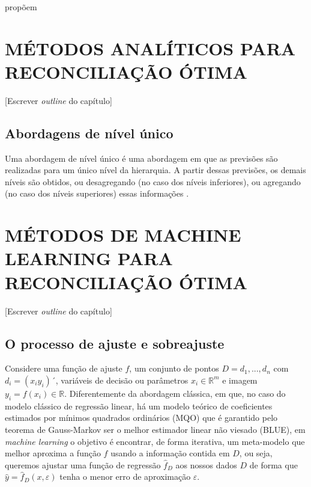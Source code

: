\documentclass[
  12pt,
  oneside,
  a4paper,
  chapter=TITLE,
  section=TITLE,
  brazil]{abntex2}
\begin{document}
\textcite{spiliotis_hierarchical_2021} propõem

\hypertarget{muxe9todos-analuxedticos-para-reconciliauxe7uxe3o-uxf3tima}{%
\section{MÉTODOS ANALÍTICOS PARA RECONCILIAÇÃO
ÓTIMA}\label{muxe9todos-analuxedticos-para-reconciliauxe7uxe3o-uxf3tima}}

{[}Escrever \emph{outline} do capítulo{]}

\hypertarget{abordagens-de-nuxedvel-uxfanico}{%
\subsection{Abordagens de nível
único}\label{abordagens-de-nuxedvel-uxfanico}}

Uma abordagem de nível único é uma abordagem em que as previsões são
realizadas para um único nível da hierarquia. A partir dessas previsões,
os demais níveis são obtidos, ou desagregando (no caso dos níveis
inferiores), ou agregando (no caso dos níveis superiores) essas
informações \autocite{hyndman_forecasting_2021}.

\hypertarget{muxe9todos-de-machine-learning-para-reconciliauxe7uxe3o-uxf3tima}{%
\section{MÉTODOS DE MACHINE LEARNING PARA RECONCILIAÇÃO
ÓTIMA}\label{muxe9todos-de-machine-learning-para-reconciliauxe7uxe3o-uxf3tima}}

{[}Escrever \emph{outline} do capítulo{]}

\hypertarget{o-processo-de-ajuste-e-sobreajuste}{%
\subsection{O processo de ajuste e
sobreajuste}\label{o-processo-de-ajuste-e-sobreajuste}}

Considere uma função de ajuste \(f\), um conjunto de pontos
\(D = {d_1, ..., d_n}\) com \(d_i = (x_i y_i)´\), variáveis de decisão
ou parâmetros \(x_i \in \mathbb{R}^m\) e imagem
\(y_i = f(x_i) \in \mathbb{R}\). Diferentemente da abordagem clássica,
em que, no caso do modelo clássico de regressão linear, há um modelo
teórico de coeficientes estimados por mínimos quadrados ordinários (MQO)
que é garantido pelo teorema de Gauss-Markov ser o melhor estimador
linear não viesado (BLUE), em \emph{machine learning} o objetivo é
encontrar, de forma iterativa, um meta-modelo que melhor aproxima a
função \(f\) usando a informação contida em \(D\), ou seja, queremos
ajustar uma função de regressão \(\hat{f}_D\) aos nossos dados \(D\) de
forma que \(\hat{y} = \hat{f}_D(x, \varepsilon)\) tenha o menor erro de
aproximação \(\varepsilon\).
\end{document}

